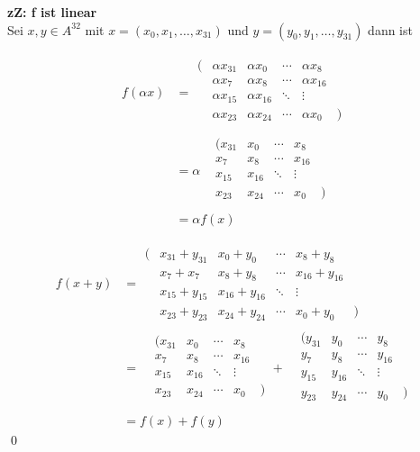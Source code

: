 \textbf{zZ: f ist linear}\\

Sei $ x,y \in A^{32} $ mit $ x = (x_0, x_1, \ldots, x_{31} )$ und 
 $ y = (y_0, y_1, \ldots, y_{31} )$ 
 dann ist

\begin{align}
f(\alpha x) &=  \begin{array}{*{14}{r}}
(&\alpha x_{31} &  \alpha x_{0} &  \cdots &  \alpha x_{8} \\
 &\alpha x_{7}  &  \alpha x_{8} &  \cdots & \alpha x_{16} \\
 &\alpha x_{15} &  \alpha x_{16} & \ddots & \vdots        \\
 &\alpha x_{23} &  \alpha x_{24} & \cdots & \alpha x_{0}  &)\\
\end{array} \\
& = \alpha  \begin{array}{*{12}{r}}
 &(x_{31} &  x_{0} &  \cdots &  x_{8} \\
 & x_{7}  &   x_{8} &  \cdots &  x_{16} \\
 &x_{15} &   x_{16} & \ddots & \vdots        \\
 &x_{23} &   x_{24} & \cdots &  x_{0} &) \\
\end{array}\\
&= \alpha f(x)
\end{align}

\begin{align}
f(x+y) &=  \begin{array}{*{14}{r}}
(& x_{31} + y_{31} &  x_{0}  +y_{0}  &  \cdots &  x_{8} + y_{8}\\
 & x_{7}  + x_{7}  &  x_{8}  +y_{8}  &  \cdots & x_{16} + y_{16} \\
 & x_{15} + y_{15} &  x_{16} +y_{16} &  \ddots & \vdots        \\
 & x_{23} + y_{23} &  x_{24} +y_{24} &  \cdots & x_{0} +y_{0} &)
\end{array} \\
 & = \begin{array}{*{12}{r}}
 &(x_{31} &  x_{0} &  \cdots &  x_{8} \\
 & x_{7}  &   x_{8} &  \cdots &  x_{16} \\
 &x_{15} &   x_{16} & \ddots & \vdots        \\
 &x_{23} &   x_{24} & \cdots &  x_{0} &) \\
\end{array} + 
\begin{array}{*{12}{r}}
 &(y_{31} &  y_{0} &  \cdots & y_{8} \\
 & y_{7}  &   y_{8} &  \cdots &  y_{16} \\
 &y_{15} &   y_{16} & \ddots & \vdots        \\
 &y_{23} &   y_{24} & \cdots &  y_{0} &) \\
\end{array}\\
&= f(x)+f(y)
\end{align}
\qed

